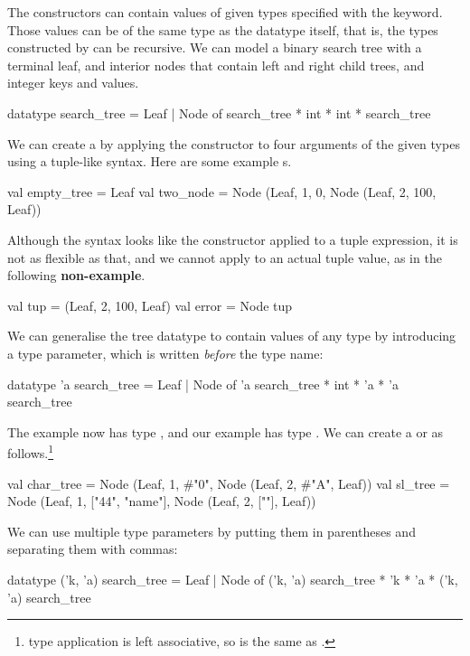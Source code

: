\documentclass[12pt,a4paper]{book}
\begin{document}
The constructors can contain values of given types specified with the
 keyword. Those values can be of the same type as the datatype
itself, that is, the types constructed by  can be recursive.
We can model a binary search tree with a terminal leaf, and interior nodes that
contain left and right child trees, and integer keys and values.
\begin{smlcode}
datatype search_tree =
  Leaf
| Node of search_tree * int * int * search_tree
\end{smlcode}
We can create a  by applying the constructor to four
arguments of the given types using a tuple-like syntax. Here are some example
s.
\begin{smlcode}
val empty_tree = Leaf
val two_node = Node (Leaf, 1, 0, Node (Leaf, 2, 100, Leaf))
\end{smlcode}
Although the syntax looks like the constructor applied to a tuple expression,
it is not as flexible as that, and we cannot apply  to an
actual tuple value, as in the following \textbf{non-example}.
\begin{smlcode}
val tup = (Leaf, 2, 100, Leaf)
val error = Node tup
\end{smlcode}

We can generalise the tree datatype to contain values of any type by
introducing a type parameter, which is written \emph{before} the type name:
\begin{smlcode}
datatype 'a search_tree =
  Leaf
| Node of 'a search_tree * int * 'a * 'a search_tree
\end{smlcode}
The  example now has type , and our
 example has type . We can create a
 or  as follows.\footnote{type application is left associative, so  is the same as .}
\begin{smlcode}
val char_tree = Node (Leaf, 1, #"0", Node (Leaf, 2, #"A", Leaf))
val sl_tree = Node (Leaf, 1, ["44", "name"], Node (Leaf, 2, [""], Leaf))
\end{smlcode}


We can use multiple type parameters by putting them in parentheses and separating them with commas:
\begin{smlcode}
datatype ('k, 'a) search_tree =
  Leaf
| Node of ('k, 'a) search_tree * 'k * 'a * ('k, 'a) search_tree
\end{smlcode}
\end{document}
